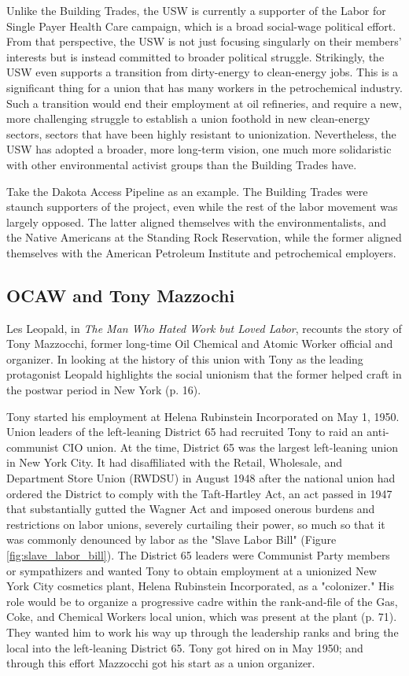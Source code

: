 \documentclass[12pt]{article}
\begin{document}
Unlike the Building Trades, the USW is currently a supporter of the Labor for Single Payer Health Care campaign, which is a broad social-wage political effort. From that perspective, the USW is not just focusing singularly on their members’ interests but is instead committed to broader political struggle. Strikingly, the USW even supports a transition from dirty-energy to clean-energy jobs. This is a significant thing for a union that has many workers in the petrochemical industry. Such a transition would end their employment at oil refineries, and require a new, more challenging struggle to establish a union foothold in new clean-energy sectors, sectors that have been highly resistant to unionization. Nevertheless, the USW has adopted a broader, more long-term vision, one much more solidaristic with other environmental activist groups than the Building Trades have.

Take the Dakota Access Pipeline as an example. The Building Trades were staunch supporters of the project, even while the rest of the labor movement was largely opposed. The latter aligned themselves with the environmentalists, and the Native Americans at the Standing Rock Reservation, while the former aligned themselves with the American Petroleum Institute and petrochemical employers.

\subsection{OCAW and Tony Mazzochi}

Les Leopald, in \textit{The Man Who Hated Work but Loved Labor}, recounts the story of Tony Mazzocchi, former long-time Oil Chemical and Atomic Worker official and organizer. In looking at the history of this union with Tony as the leading protagonist Leopald highlights the social unionism that the former helped craft in the postwar period in New York (p. 16).

Tony started his employment at Helena Rubinstein Incorporated on May 1, 1950. Union leaders of the left-leaning District 65 had recruited Tony to raid an anti-communist CIO union. At the time, District 65 was the largest left-leaning union in New York City. It had disaffiliated with the Retail, Wholesale, and Department Store Union (RWDSU) in August 1948 after the national union had ordered the District to comply with the Taft-Hartley Act, an act passed in 1947 that substantially gutted the Wagner Act  and imposed onerous burdens and restrictions on labor unions, severely curtailing their power, so much so that it was commonly denounced by labor as the "Slave Labor Bill" (Figure \ref{fig:slave_labor_bill}). The District 65 leaders were Communist Party members or sympathizers and wanted Tony to obtain employment at a unionized New York City cosmetics plant, Helena Rubinstein Incorporated, as a "colonizer." His role would be to organize a progressive cadre within the rank-and-file of the Gas, Coke, and Chemical Workers local union, which was present at the plant (p. 71). They wanted him to work his way up through the leadership ranks and bring the local into the left-leaning District 65. Tony got hired on in May 1950; and through this effort Mazzocchi got his start as a union organizer.
\end{document}
